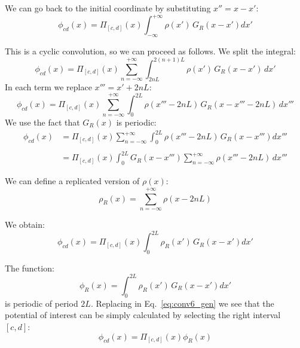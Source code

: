 We can go back to the initial coordinate by substituting $x'' = x-x'$:
\begin{equation}
\phi_{cd}(x) = 
\Pi_{[c,d]}\left({x}\right)
\int_{-\infty}^{+\infty} 
\rho(x')\,G_{R}(x-x') dx'
\end{equation}

This is a cyclic convolution, so we can proceed as follows. We split the integral:
\begin{equation}
\phi_{cd}(x) = 
\Pi_{[c,d]}\left({x}\right)
\sum_{n=-\infty}^{+\infty}
\int_{2nL}^{2(n+1)L} 
\rho(x')\,G_{R}(x-x') \,dx'
\label{eq:conv3_gen}
\end{equation}
In each term we replace $x''' = x'+2nL$:
\begin{equation}
\phi_{cd}(x) = 
\Pi_{[c,d]}\left({x}\right)
\sum_{n=-\infty}^{+\infty}
\int_{0 }^{2L} 
\rho(x'''-2nL)\,G_{R}(x-x'''-2nL) \,dx'''
\label{eq:conv4_gen}
\end{equation}
We use the fact that $G_{R}(x)$ is periodic:
\begin{equation}
\begin{split}
\phi_{cd}(x) &= 
\Pi_{[c,d]}\left({x}\right)
\sum_{n=-\infty}^{+\infty}
\int_{0 }^{2L} 
\rho(x'''-2nL)\,G_{R}(x-x''') dx'''\\
\\&=
\Pi_{[c,d]}\left({x}\right)
\int_{0 }^{2L}  
G_{R}(x-x''')
\sum_{n=-\infty}^{+\infty}
\rho(x'''-2nL) 
\, dx'''
\end{split}
\label{eq:conv5_gen}
\end{equation}

We can define a replicated version of $\rho(x)$:
\begin{equation}
\rho_{R}(x)= \sum_{n=-\infty}^{+\infty}
\rho(x-2nL)
\end{equation}


We obtain:
\begin{equation}
\phi_{cd}(x) = 
\Pi_{[c,d]}\left({x}\right)
\int_{0 }^{2L} 
\rho_{R}(x')\,G_{R}(x-x') dx'
\label{eq:conv6_gen}
\end{equation}

The function:
\begin{equation}
\phi_{R}(x) = 
\int_{0 }^{2L} 
\rho_{R}(x')\,G_{R}(x-x') dx'
\label{eq:confin_gen}
\end{equation}
is periodic of period $2L$. Replacing in Eq.~\ref{eq:conv6_gen} we see that the potential of interest can be simply calculated by selecting the right interval $[c, d]$:
\begin{equation}
\phi_{cd}(x) = 
\Pi_{[c,d]}\left({x}\right)
\phi_{R}(x)
\label{eq:sel_gen}
\end{equation}

